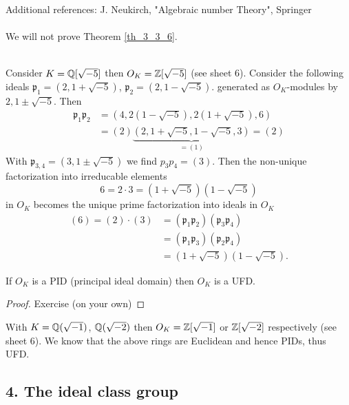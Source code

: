 \documentclass[NumTh.tex]{subfiles}
\begin{document}

Additional references: J. Neukirch, "Algebraic number Theory", Springer \\
\\
We will not prove Theorem \ref{th_3_3_6}.\\
\\

\begin{ex}
  Consider $K = \mathbb{Q}[\sqrt{-5}]$ then $O_K = \mathbb{Z}[\sqrt{-5}]$ (see sheet 6).
  Consider the following ideals $\mathfrak{p}_1 = (2, 1 + \sqrt{-5})$, $\mathfrak{p}_2 = (2, 1 - \sqrt{-5})$.
  generated as $O_K$-modules by $2, 1 \pm \sqrt{-5}$. Then 
  \begin{align*}
    \mathfrak{p}_1 \mathfrak{p}_2 &= (4, 2 (1 - \sqrt{-5}), 2 (1+ \sqrt{-5}), 6) \\
    &= (2) \underbrace{(2, 1 + \sqrt{-5}, 1 - \sqrt{-5}, 3)}_{ = (1)} = (2)
  \end{align*}
  With $\mathfrak{p}_{3,4} = (3, 1 \pm \sqrt{-5})$ we find $p_3 p_4 = (3)$.
  Then the non-unique factorization into irreducable elements
  \[ 6 = 2 \cdot 3 = (1 + \sqrt{-5}) (1 - \sqrt{-5}) \]
  in $O_K$ becomes the unique prime factorization into ideals in $O_K$
  \begin{align*}
    (6) = (2) \cdot (3) &= (\mathfrak{p}_1 \mathfrak{p}_2) (\mathfrak{p}_3 \mathfrak{p}_4) \\
    &= (\mathfrak{p}_1 \mathfrak{p}_3) (\mathfrak{p}_2 \mathfrak{p}_4) \\
    &= (1 + \sqrt{-5}) (1 - \sqrt{-5}) \text{.}
  \end{align*}
\end{ex}

\begin{cor}
  If $O_K$ is a PID (principal ideal domain) then $O_K$ is a UFD.
\end{cor}

\begin{proof}
  Exercise (on your own)
\end{proof}

\begin{ex}
  With $K = \mathbb{Q}(\sqrt{-1})$, $\mathbb{Q}(\sqrt{-2})$ then $O_K = \mathbb{Z}[\sqrt{-1}]$ or $\mathbb{Z}[\sqrt{-2}]$ respectively (see sheet 6).
  We know that the above rings are Euclidean and hence PIDs, thus UFD.
\end{ex}


\subsection{4. The ideal class group}
\end{document}
